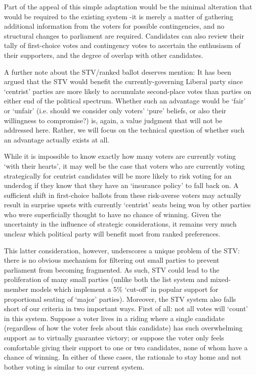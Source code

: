 \documentclass[DIV=calc, paper=a4, fontsize=11pt, twocolumn]{scrartcl}	 %
\begin{document}
Part of the appeal of this simple adaptation would be the minimal alteration that would be required to the existing system \--it is merely a matter of gathering additional information from the voters for possible contingencies, and no structural changes to parliament are required. Candidates can also review their tally of first-choice votes and contingency votes to ascertain the enthusiasm of their supporters, and the degree of overlap with other candidates. 

A further note about the STV/ranked ballot deserves mention: It has been argued\cite{Record}
 that the STV would benefit the currently-governing Liberal party since  `centrist' parties are more likely to accumulate second-place votes than parties on either end of the political spectrum. 
Whether such an advantage would be `fair' or `unfair' (i.e. should we consider only voters' `pure' beliefs, or also their willingness to compromise?) is, again, a value judgment that will not be addressed here. Rather, we will focus on the technical question of whether such an advantage actually exists at all.

While it is impossible to know exactly how many voters are currently voting `with their hearts', it may well be the case that voters who are currently voting strategically for centrist candidates will be more likely to risk voting for an underdog if they know that they have an `insurance policy' to fall back on. 
A sufficient shift in first-choice ballots from these risk-averse voters may actually result in surprise upsets with currently `centrist' seats being won by other parties who were superficially thought to have no chance of winning. Given the uncertainty in the influence of strategic considerations, it remains very much unclear which political party will benefit most from ranked preferences. 

This latter consideration, however, underscores a unique problem of the STV:  there is no obvious mechanism for filtering out small parties to prevent parliament from becoming fragmented. As such, STV could lead to the proliferation of many small parties
(unlike both the list system and  mixed-member models which implement a 5\% `cut-off' in popular support for proportional seating of `major' parties). 
Moreover, the STV system also falls short of our criteria in two important ways.
First of all: not all votes will `count' in this system. Suppose a voter lives in a riding where a single candidate (regardless of how the voter feels about this candidate) has such overwhelming support as to virtually guarantee victory; or suppose the voter only feels comfortable giving their support to one or two candidates, none of whom have a chance of winning. In either of these cases, the rationale to stay home and not bother voting is similar to our current system. 
\end{document}
